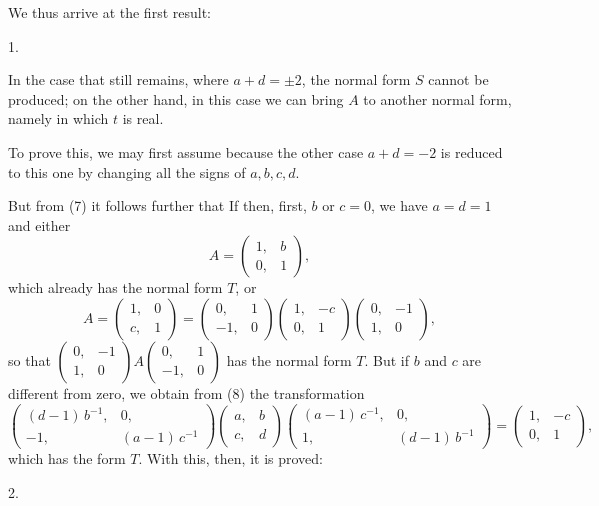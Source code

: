 We thus arrive at the first result:

1.~

In the case that still remains, where $a+d = \pm 2$, the
normal form $S$ cannot be produced; on the other hand, in
this case we can bring $A$ to another normal form, namely
in which $t$ is real.

To prove this, we may first assume
because the other case $a+d = -2$ is reduced to this one by
changing all the signs of $a, b, c, d$.

But from (7) it follows further that
If then, first, $b$ or $c = 0$, we have $a = d = 1$
and either
\[
A = \begin{pmatrix} 1, & b \\ 0, & 1 \end{pmatrix},
\]
which already has the normal form $T$, or
\[
A = \begin{pmatrix} 1, & 0 \\ c, & 1 \end{pmatrix} = \begin{pmatrix} 0, & 1 \\ -1, & 0 \end{pmatrix} \begin{pmatrix} 1, & -c \\ 0, & 1 \end{pmatrix} \begin{pmatrix} 0, & -1 \\ 1, & 0 \end{pmatrix},
\]
so that $\begin{pmatrix} 0, & -1 \\ 1, & 0 \end{pmatrix} A \begin{pmatrix} 0, & 1 \\ -1, & 0 \end{pmatrix}$ has the normal form $T$. But if $b$ and $c$ are different from zero,
we obtain from (8) the transformation
\[
\begin{pmatrix} (d-1)\,b^{-1}, & 0, \\ -1, & (a-1)\,c^{-1} \end{pmatrix} \begin{pmatrix} a, & b \\ c, & d \end{pmatrix} \begin{pmatrix} (a-1)\,c^{-1}, & 0, \\ 1, & (d-1)\,b^{-1} \end{pmatrix} = \begin{pmatrix} 1, & -c \\ 0, & 1 \end{pmatrix},
\]
which has the form $T$. With this, then, it is proved:

2.~
